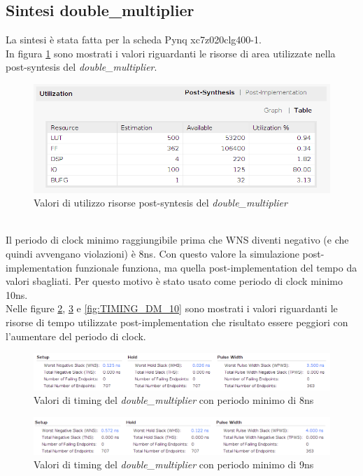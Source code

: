 \documentclass[]{IEEEtran}
\begin{document}
\subsection{Sintesi double\_multiplier}
La sintesi è stata fatta per la scheda Pynq xc7z020clg400-1.
\\In figura \ref{fig:UTIL_SYNT_DM} sono mostrati i valori riguardanti le risorse di area utilizzate nella post-syntesis del \textit{double\_multiplier}.
\begin{figure}[!htb]
    \centering
    \includegraphics[width=0.9\linewidth]{figures/util_synt_dm}
    \caption{Valori di utilizzo risorse post-syntesis del \textit{double\_multiplier}}
    \label{fig:UTIL_SYNT_DM}
\end{figure}
\\Il periodo di clock minimo raggiungibile prima che WNS diventi negativo (e che quindi avvengano violazioni) è 8ns. Con questo valore la simulazione post-implementation funzionale funziona, ma quella post-implementation del tempo da valori sbagliati. Per questo motivo è stato usato come periodo di clock minimo 10ns. \\Nelle figure \ref{fig:TIMING_DM_8}, \ref{fig:TIMING_DM_9} e \ref{fig:TIMING_DM_10} sono mostrati i valori riguardanti le risorse di tempo utilizzate post-implementation che risultato essere peggiori con l'aumentare del periodo di clock.
\begin{figure}[!htb]
    \centering
    \includegraphics[width=1.0\linewidth]{figures/8-timing}
    \caption{Valori di timing del \textit{double\_multiplier} con periodo minimo di 8ns}
    \label{fig:TIMING_DM_8}
\end{figure}
\begin{figure}[!htb]
    \centering
    \includegraphics[width=1.0\linewidth]{figures/9-timing}
    \caption{Valori di timing del \textit{double\_multiplier} con periodo minimo di 9ns}
    \label{fig:TIMING_DM_9}
\end{figure}
\end{document}

